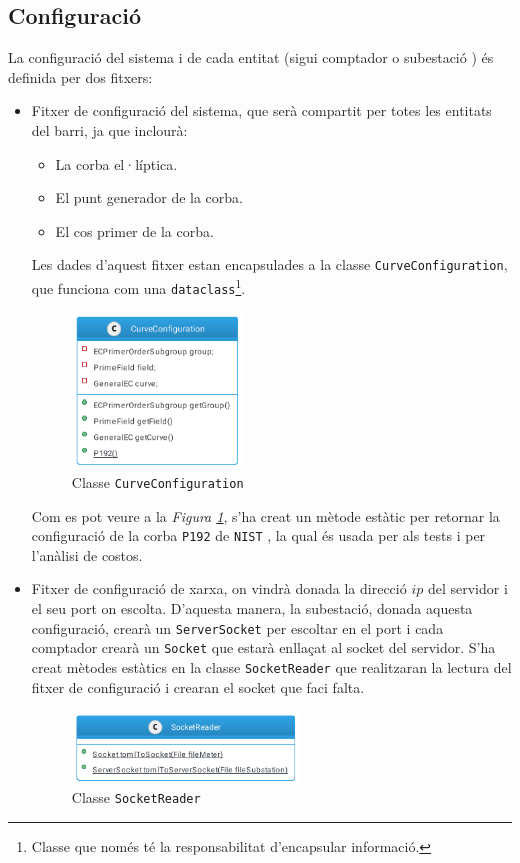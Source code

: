 \subsection{Configuració}
La configuració del sistema i de cada entitat (sigui comptador o subestació ) és definida per dos fitxers:
\begin{itemize}
	\item Fitxer de configuració del sistema, que serà compartit per totes les entitats del barri, ja que inclourà:
	\begin{itemize}
		\item La corba el·líptica.
		\item El punt generador de la corba.
		\item El cos primer de la corba.
	\end{itemize}
	Les dades d'aquest fitxer estan encapsulades a la classe \texttt{CurveConfiguration}, que funciona com una \texttt{dataclass}\footnote{Classe que només té la responsabilitat d'encapsular informació.}.
	\begin{figure}[H]
		\centering
		\includegraphics[width=4.5cm]{classes/curve.png}
		\caption{Classe \texttt{CurveConfiguration}}
		\label{fig:curve}
	\end{figure}
	Com es pot veure a la \textit{Figura \ref{fig:curve}}, s'ha creat un mètode estàtic per retornar la configuració de la corba \texttt{P192} de \texttt{NIST} \cite{p192}, la qual és usada per als tests i per l'anàlisi de costos.
	\item Fitxer de configuració de xarxa, on vindrà donada la direcció $ip$ del servidor i el seu port on escolta. D'aquesta manera, la subestació, donada aquesta configuració, crearà un \texttt{ServerSocket} per escoltar en el port i cada comptador crearà un \texttt{Socket} que estarà enllaçat al socket del servidor. S'ha creat mètodes estàtics en la classe \texttt{SocketReader} que realitzaran la lectura del fitxer de configuració i crearan el socket que faci falta.
	\begin{figure}[H]
		\centering
		\includegraphics[width=6cm]{classes/socket.png}
		\caption{Classe \texttt{SocketReader}}
		\label{fig:socket}
	\end{figure}
	
\end{itemize}

